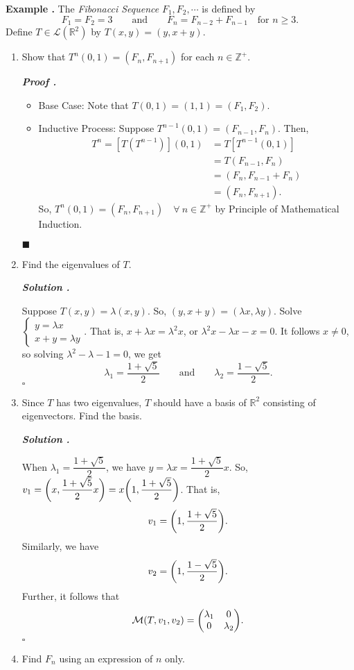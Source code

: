 \documentclass[11pt, letterpaper]{article}
\newcounter{index}[subsection]
\newenvironment*{eg}{\begin{framed}\par\noindent\textbf{Example \thesubsection.\stepcounter{index}\theindex}}{\par\end{framed}}
\newcounter{nprf}[subsection]
\newenvironment*{prf}{\par\indent\textbf{\textit{Proof \stepcounter{nprf}\thenprf.}}}{\hfill$\blacksquare$\par}
\newenvironment*{sol}{\par\indent\textbf{\textit{Solution \stepcounter{nprf}\thenprf.}}\par}{\hfill{$\square$}\par}
\def\Zp{\mathbb{Z}^+}
\def\R{\mathbb{R}}
\def\L{\mathcal{L}}
\def\M{\mathcal{M}}
\begin{document}
\begin{eg}
	The \textit{Fibonacci Sequence} $F_1,F_2,\cdots$ is defined by \[F_1=F_2=3\qquad\text{and}\qquad F_n=F_{n-2}+F_{n-1}\quad\text{for }n\geq3.\] Define $T\in\L(\R^2)$ by $T(x,y)=(y,x+y).$
	\begin{enumerate}
		\item Show that $T^n(0,1)=(F_n,F_{n+1})$ for each $n\in\Zp$.
		\begin{prf}
			\begin{itemize}
				\item Base Case: Note that $T(0,1)=(1,1)=(F_1,F_2)$.
				\item Inductive Process: Suppose $T^{n-1}(0,1)=(F_{n-1},F_n)$. Then, \[\begin{aligned}T^n=[T(T^{n-1})](0,1)&=T[T^{n-1}(0,1)]\\&=T(F_{n-1},F_n)\\&=(F_n,F_{n-1}+F_n)\\&=(F_n,F_{n+1}).\end{aligned}\] So, $T^n(0,1)=(F_n,F_{n+1})\quad\forall\ n\in\Zp$ by Principle of Mathematical Induction. 
			\end{itemize}
		\end{prf}
		\item Find the eigenvalues of $T$.
		\begin{sol}
			Suppose $T(x,y)=\lambda(x,y)$. So, $(y,x+y)=(\lambda x,\lambda y)$. Solve $\begin{cases}y=\lambda x\\x+y=\lambda y\end{cases}$. That is, $x+\lambda x=\lambda^2x$, or $\lambda^2x-\lambda x-x=0$. It follows $x\neq0$, so solving $\lambda^2-\lambda-1=0$, we get \[\lambda_1=\dfrac{1+\sqrt{5}}{2}\qquad\text{and}\qquad\lambda_2=\dfrac{1-\sqrt{5}}{2}.\]
		\end{sol}
		\item Since $T$ has two eigenvalues, $T$ should have a basis of $\R^2$ consisting of eigenvectors. Find the basis.
		\begin{sol}
			When $\lambda_1=\dfrac{1+\sqrt{5}}{2}$, we have $y=\lambda x=\dfrac{1+\sqrt{5}}{2}x$. So, $v_1=\qty(x,\dfrac{1+\sqrt{5}}{2}x)=x\qty(1,\dfrac{1+\sqrt{5}}{2})$. That is, \[v_1=\qty(1,\dfrac{1+\sqrt{5}}{2}).\] Similarly, we have \[v_2=\qty(1,\dfrac{1-\sqrt{5}}{2}).\] Further, it follows that \[\M(T,v_1,v_2)=\mqty(\lambda_1&0\\0&\lambda_2).\]
		\end{sol}
		\item Find $F_n$ using an expression of $n$ only. 

\end{enumerate}
\end{eg}
\end{document}
